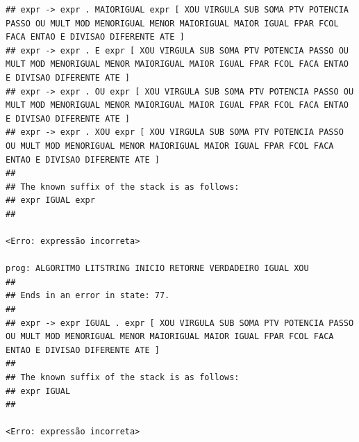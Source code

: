 \documentclass[hidelinks,12pt]{article}
\begin{document}
\begin{lstlisting}
## expr -> expr . MAIORIGUAL expr [ XOU VIRGULA SUB SOMA PTV POTENCIA PASSO OU MULT MOD MENORIGUAL MENOR MAIORIGUAL MAIOR IGUAL FPAR FCOL FACA ENTAO E DIVISAO DIFERENTE ATE ]
## expr -> expr . E expr [ XOU VIRGULA SUB SOMA PTV POTENCIA PASSO OU MULT MOD MENORIGUAL MENOR MAIORIGUAL MAIOR IGUAL FPAR FCOL FACA ENTAO E DIVISAO DIFERENTE ATE ]
## expr -> expr . OU expr [ XOU VIRGULA SUB SOMA PTV POTENCIA PASSO OU MULT MOD MENORIGUAL MENOR MAIORIGUAL MAIOR IGUAL FPAR FCOL FACA ENTAO E DIVISAO DIFERENTE ATE ]
## expr -> expr . XOU expr [ XOU VIRGULA SUB SOMA PTV POTENCIA PASSO OU MULT MOD MENORIGUAL MENOR MAIORIGUAL MAIOR IGUAL FPAR FCOL FACA ENTAO E DIVISAO DIFERENTE ATE ]
##
## The known suffix of the stack is as follows:
## expr IGUAL expr 
##

<Erro: expressão incorreta>

prog: ALGORITMO LITSTRING INICIO RETORNE VERDADEIRO IGUAL XOU 
##
## Ends in an error in state: 77.
##
## expr -> expr IGUAL . expr [ XOU VIRGULA SUB SOMA PTV POTENCIA PASSO OU MULT MOD MENORIGUAL MENOR MAIORIGUAL MAIOR IGUAL FPAR FCOL FACA ENTAO E DIVISAO DIFERENTE ATE ]
##
## The known suffix of the stack is as follows:
## expr IGUAL 
##

<Erro: expressão incorreta>


\end{lstlisting}
\end{document}
